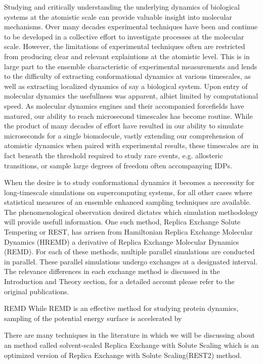 Studying and critically understanding the underlying dynamics of biological systems at the atomistic scale can provide valuable insight into molecular mechanisms. 
Over many decades experimental techniques have been and continue to be developed in a collective effort to investigate processes at the molecular scale.
However, the limitations of experimental techniques often are restricted from producing clear and relevant explaintions at the atomistic level. 
This is in large part to the ensemble characteristic of experimental measurements and lends to the difficulty of extracting conformational dynamics at various timescales, as well as extracting localized dynamics of say a biological system. 
Upon entry of molecular dynamics the usefullness was apparent, albiet limited by computational speed. 
As molecular dynamics engines\cite{Weiner1981,gotz2012,salomon-ferrer2013,Brooks1983,Brooks2009,VanDerSpoel2005} and their accompanied forcefields\cite{Huang2016,Ploetz2021,Cornell1995,lindorff-larsen2010,Robustelli2018,Jakobsen2015,Piana2020} have matured, our ability to reach microsecond timescales has become routine. 
While the product of many decades of effort have resulted in our ability to simulate microseconds for a single biomolecule, vastly extending our comprehension of atomistic dynamics when paired with experimental results, these timescales are in fact beneath the threshold required to study rare events, e.g. allosteric transitions, or sample large degrees of freedom often accompanying IDPs. 

When the desire is to study conformational dynamics it becomes a neccessity for long-timescale simulations on supercomputing systems\cite{Shaw2009,Shaw2014}, for all other cases where statistical measures of an ensemble enhanced sampling techniques are available\cite{Lee2016,Wang2011,Qi2018,Vitalis2009,Zhang2023,Ray2023,Prakash2018}. 
The phenomenological observation desired dictates which simulation methodology will provide usefull information.
One such method, Replica Exchange Solute Tempering or REST\cite{Liu2005,Wang2011,Zhang2023}, has arrisen from Hamiltonian Replica Exchange Molecular Dynamics (HREMD) a derivative of Replica Exchange Molecular Dynamics (REMD). 
For each of these methods, multiple parallel simulations are conducted in parallel. 
These parallel simulations undergo exchanges at a designated interval.
The relevance differences in each exchange method is discussed in the Introduction and Theory section, for a detailed account please refer to the original publications\cite{Sugita1999,Liu2005,Wang2011}.

REMD 
While REMD is an effective method for studying protein dynamics, sampling of the potential energy surface is accelerated by



There are many techniques in the literature in which we will be discussing about an method called solvent-scaled Replica Exchange with Solute Scaling which is an optimized version of Replica Exchange with Solute Scaling(REST2) method.   